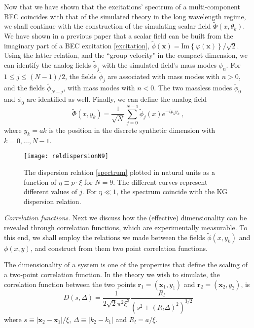 \documentclass[aps,prl,twocolumn,unsortedaddress,superscriptaddress]{revtex4-1}
\newcommand{\x}{\mathbf{x}}
\newcommand{\rr}{\mathbf{r}}
\begin{document}
Now that we have shown that the excitations' spectrum of a multi-component BEC coincides with that of the simulated theory in the long wavelength regime, we shall continue with the construction of the simulating scalar field $\tilde{\Phi}(x,\theta_{k})$.
We have shown in a previous paper \cite{leizerovitch2016} that a scalar field can be built from the imaginary part of a BEC excitation \eqref{excitation}, $\tilde{\phi}(\x)=\text{Im}\left\lbrace\varphi(\x)\right\rbrace/\sqrt{2}$. Using the latter relation, and the ``group velocity" in the compact dimension, we can identify the analog fields $\tilde{\phi}_j$ with the simulated field's mass modes $\phi_n$. For $1\leq j\leq (N-1)/2$, the fields $\tilde{\phi}_j$ are associated with mass modes with $n>0$, and the fields $\tilde{\phi}_{N-j}$, with mass modes with $n<0$. The two massless modes $\tilde{\phi}_0$ and $\phi_0$ are identified as well.
Finally, we can define the analog field
\begin{equation}\label{5d_simulating_field}
\tilde{\Phi}(x,y_{k})=\frac{1}{\sqrt{N}}\sum_{j=0}^{N-1}\tilde{\phi}_j(x)e^{-i p_5 y_k }~,
\end{equation}
where $y_k=ak$ is the position in the discrete synthetic dimension with $k=0,...,N-1$.

\begin{figure}[t]
                \texttt{[image: reldispersionN9]}
                \caption{The dispersion relation \eqref{spectrum} plotted in natural units as a function of $\eta\equiv p\cdot\xi$ for $N=9$. The different curves represent different values of $j$. For $\eta\ll 1$, the spectrum coincide with the KG dispersion relation.}
                \label{fig:rel_dispersion}
\end{figure} 

\vspace{.3cm}
{\em Correlation functions}.
Next we discuss how the (effective) dimensionality can be revealed through correlation functions, which are experimentally measurable.
To this end, we shall employ the relations we made between the fields $\tilde{\phi}(x,y_k)$ and $\phi(x,y)$, and construct from them two point correlation functions.

The dimensionality of a system is one of the properties that define the scaling of a two-point correlation function. 
In the theory we wish to simulate, the correlation function between the two points $\rr_1=(\x_1,y_1)$ and $\rr_2=(\x_2,y_2)$, is
\begin{equation}\label{simulated_corr}
D(s,\Delta)= \frac{1}{2\sqrt{2}\pi^{2}\xi^{3}}\frac{R_l}{(s^{2}+(R_l \Delta)^{2})^{3/2}}
\end{equation}
where $s\equiv|\x_2-\x_1|/\xi$, $\Delta\equiv|k_2-k_1|$ and $R_l=a/\xi$.
\end{document}
